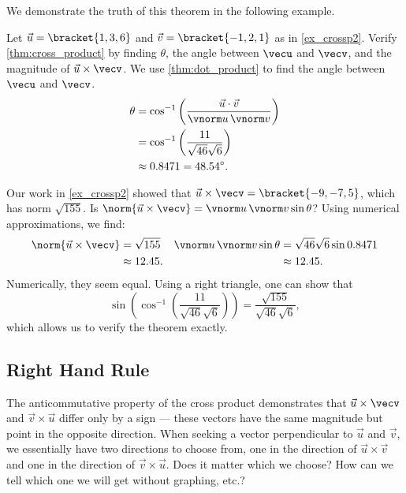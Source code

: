 We demonstrate the truth of this theorem in the following example.

\begin{example}\label{ex_crossp3}%
Let $\vec u =\bracket{1,3,6}$ and $\vec v = \bracket{-1,2,1}$ as in \autoref{ex_crossp2}. Verify \autoref{thm:cross_product} by finding $\theta$, the angle between $\vecu$ and $\vecv$, and the magnitude of $\vec u\times\vecv$.
\solution
We use \autoref{thm:dot_product} to find the angle between $\vecu$ and $\vecv$. 
\begin{align*}
\theta &= \cos^{-1}\left(\frac{\vec u\cdot\vec v}{\vnorm u\, \vnorm v}\right) \\
			&= \cos^{-1}\left(\frac{11}{\sqrt{46}\sqrt{6}}\right)\\
			&\approx 0.8471 = 48.54^\circ.
\end{align*}

Our work in \autoref{ex_crossp2} showed that $\vec u\times\vecv = \bracket{-9,-7,5}$, which has norm $\sqrt{155}.$ Is $\norm{\vec u\times\vecv} = \vnorm u\, \vnorm v\sin\theta$? Using numerical approximations, we find:
\begin{align*}
\norm{\vec u\times\vecv}
 &=\sqrt{155}  & \vnorm u\,\vnorm v \sin\theta & = \sqrt{46}\sqrt{6}\sin 0.8471\\
 &\approx 12.45. & &\approx 12.45.
\end{align*}
Numerically, they seem equal. Using a right triangle, one can show that 
\[\sin\left(\cos^{-1}\left(\frac{11}{\sqrt{46}\sqrt{6}}\right)\right) = \frac{\sqrt{155}}{\sqrt{46}\sqrt{6}},\]
which allows us to verify the theorem exactly.
\end{example}

\subsection{Right Hand Rule}

The anticommutative property of the cross product demonstrates that $\vec u\times\vecv$ and $\vec v\times\vec u$ differ only by a sign --- these vectors have the same magnitude but point in the opposite direction. When seeking a vector perpendicular to $\vec u$ and $\vec v$, we essentially have two directions to choose from, one in the direction of $\vec u\times\vec v$ and one in the direction of $\vec v\times\vec u$. Does it matter which we choose? How can we tell which one we will get without graphing, etc.?


